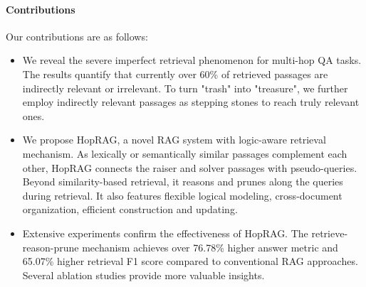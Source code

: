 \paragraph{Contributions}
Our contributions are as follows:
\begin{itemize}
\item We reveal the severe imperfect retrieval phenomenon for multi-hop QA tasks. The results quantify that currently over 60\% of retrieved passages are indirectly relevant or irrelevant. To turn "trash" into "treasure", we further employ indirectly relevant passages as stepping stones to reach truly relevant ones.
\item We propose HopRAG, a novel RAG system with logic-aware retrieval mechanism.
As lexically or semantically similar passages complement each other, HopRAG connects the raiser and solver passages with pseudo-queries. Beyond similarity-based retrieval, it reasons and prunes along the queries during retrieval. It also features flexible logical modeling, cross-document organization, efficient construction and updating.
\item Extensive experiments confirm the effectiveness of HopRAG. The retrieve-reason-prune mechanism achieves over 76.78\% higher answer metric and 65.07\% higher retrieval F1 score compared to conventional RAG approaches. Several ablation studies provide more valuable insights.
\end{itemize}








 